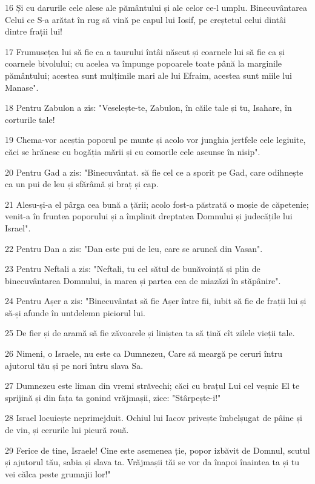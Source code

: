 \par 16 Și cu darurile cele alese ale pământului și ale celor ce-l umplu. Binecuvântarea Celui ce S-a arătat în rug să vină pe capul lui Iosif, pe creștetul celui dintâi dintre frații lui!
\par 17 Frumusețea lui să fie ca a taurului întâi născut și coarnele lui să fie ca și coarnele bivolului; cu acelea va împunge popoarele toate până la marginile pământului; acestea sunt mulțimile mari ale lui Efraim, acestea sunt miile lui Manase".
\par 18 Pentru Zabulon a zis: "Veselește-te, Zabulon, în căile tale și tu, Isahare, în corturile tale!
\par 19 Chema-vor aceștia poporul pe munte și acolo vor junghia jertfele cele legiuite, căci se hrănesc cu bogăția mării și cu comorile cele ascunse în nisip".
\par 20 Pentru Gad a zis: "Binecuvântat. să fie cel ce a sporit pe Gad, care odihnește ca un pui de leu și sfărâmă și braț și cap.
\par 21 Alesu-și-a el pârga cea bună a țării; acolo fost-a păstrată o moșie de căpetenie; venit-a în fruntea poporului și a împlinit dreptatea Domnului și judecățile lui Israel".
\par 22 Pentru Dan a zis: "Dan este pui de leu, care se aruncă din Vasan".
\par 23 Pentru Neftali a zis: "Neftali, tu cel sătul de bunăvoință și plin de binecuvântarea Domnului, ia marea și partea cea de miazăzi în stăpânire".
\par 24 Pentru Așer a zis: "Binecuvântat să fie Așer între fii, iubit să fie de frații lui și să-și afunde în untdelemn piciorul lui.
\par 25 De fier și de aramă să fie zăvoarele și liniștea ta să țină cît zilele vieții tale.
\par 26 Nimeni, o Israele, nu este ca Dumnezeu, Care să meargă pe ceruri întru ajutorul tău și pe nori întru slava Sa.
\par 27 Dumnezeu este liman din vremi străvechi; căci cu brațul Lui cel veșnic El te sprijină și din fața ta gonind vrăjmașii, zice: "Stârpește-i!"
\par 28 Israel locuiește neprimejduit. Ochiul lui Iacov privește îmbelșugat de pâine și de vin, și cerurile lui picură rouă.
\par 29 Ferice de tine, Israele! Cine este asemenea ție, popor izbăvit de Domnul, scutul și ajutorul tău, sabia și slava ta. Vrăjmașii tăi se vor da înapoi înaintea ta și tu vei călca peste grumajii lor!"

